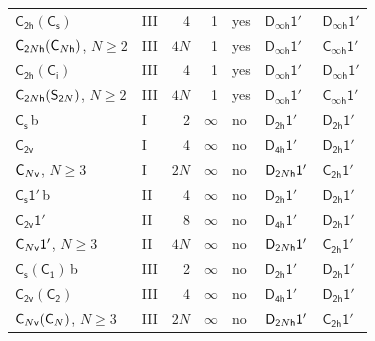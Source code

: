 \documentclass[10pt,a4paper]{article}
\makeatletter
\def\grouprule#1#2{\noalign{\marks\LTgroupmarks{\the\belowrulesep}\nobreak\vskip#1%
  \vskip\aboverulesep}\multispan\LT@cols\unskip{\leaders\hrule\@height#2\hfill\kern\z@}\cr
  \noalign{\penalty\LTrulebreak\vskip\belowrulesep\global\@lastruleclass\z@}}
\numberwithin{equation}{section}
\newcommand{\grp}[1]{\mathsf{#1}}
\newcommand{\clsletter}[1]{\,{\scriptsize\color{black!55}#1}}
\makeatother
\begin{document}
{\begin{longtable}{@{}llrrlll@{}}
\href{C2h-C1v.pdf}{$\grp{C_{2h}}(\grp{C_{s}})$} & III & 4 & 1 & yes & \href{Dinfh-1p.pdf}{$\grp{D_{\infty h}1'}$} & \href{Dinfh-1p.pdf}{$\grp{D_{\infty h}1'}$}\\
$\grp{C_{2\mathnormal{N}h}}(\grp{C_{\mathnormal{N}h}})$, $N \ge 2$ & III & $4N$ & 1 & yes & \href{Dinfh-1p.pdf}{$\grp{D_{\infty h}1'}$} & \href{Cinfh-1p.pdf}{$\grp{C_{\infty h}1'}$}\\
\href{C2h-S2.pdf}{$\grp{C_{2h}}(\grp{C_{i}})$} & III & 4 & 1 & yes & \href{Dinfh-1p.pdf}{$\grp{D_{\infty h}1'}$} & \href{Dinfh-1p.pdf}{$\grp{D_{\infty h}1'}$}\\
$\grp{C_{2\mathnormal{N}h}}(\grp{S_{2\mathnormal{N}}})$, $N \ge 2$ & III & $4N$ & 1 & yes & \href{Dinfh-1p.pdf}{$\grp{D_{\infty h}1'}$} & \href{Cinfh-1p.pdf}{$\grp{C_{\infty h}1'}$}\\
\grouprule{0pt}{\lightrulewidth}
\href{../../../rotation/data/pdf/C1v.pdf}{$\grp{C_{s}}$}\clsletter{b} & I & 2 & $\infty$ & no & \href{D2h-1p.pdf}{$\grp{D_{2h}1'}$} & \href{D2h-1p.pdf}{$\grp{D_{2h}1'}$}\\
\href{../../../rotation/data/pdf/C2v.pdf}{$\grp{C_{2v}}$} & I & 4 & $\infty$ & no & \href{D4h-1p.pdf}{$\grp{D_{4h}1'}$} & \href{D2h-1p.pdf}{$\grp{D_{2h}1'}$}\\
$\grp{C_{\mathnormal{N}v}}$, $N \ge 3$ & I & $2N$ & $\infty$ & no & $\grp{D_{2\mathnormal{N}h}1'}$ & \href{C2h-1p.pdf}{$\grp{C_{2h}1'}$}\\
\href{C1v-1p.pdf}{$\grp{C_{s}1'}$}\clsletter{b} & II & 4 & $\infty$ & no & \href{D2h-1p.pdf}{$\grp{D_{2h}1'}$} & \href{D2h-1p.pdf}{$\grp{D_{2h}1'}$}\\
\href{C2v-1p.pdf}{$\grp{C_{2v}1'}$} & II & 8 & $\infty$ & no & \href{D4h-1p.pdf}{$\grp{D_{4h}1'}$} & \href{D2h-1p.pdf}{$\grp{D_{2h}1'}$}\\
$\grp{C_{\mathnormal{N}v}1'}$, $N \ge 3$ & II & $4N$ & $\infty$ & no & $\grp{D_{2\mathnormal{N}h}1'}$ & \href{C2h-1p.pdf}{$\grp{C_{2h}1'}$}\\
\href{C1v-C1.pdf}{$\grp{C_{s}}(\grp{C_{1}})$}\clsletter{b} & III & 2 & $\infty$ & no & \href{D2h-1p.pdf}{$\grp{D_{2h}1'}$} & \href{D2h-1p.pdf}{$\grp{D_{2h}1'}$}\\
\href{C2v-C2.pdf}{$\grp{C_{2v}}(\grp{C_{2}})$} & III & 4 & $\infty$ & no & \href{D4h-1p.pdf}{$\grp{D_{4h}1'}$} & \href{D2h-1p.pdf}{$\grp{D_{2h}1'}$}\\
$\grp{C_{\mathnormal{N}v}}(\grp{C_{\mathnormal{N}}})$, $N \ge 3$ & III & $2N$ & $\infty$ & no & $\grp{D_{2\mathnormal{N}h}1'}$ & \href{C2h-1p.pdf}{$\grp{C_{2h}1'}$}\\

\end{longtable}}
\end{document}
